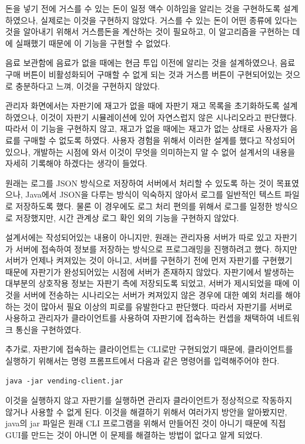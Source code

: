 \documentclass{oblivoir}
\begin{document}
    돈을 넣기 전에 거스를 수 있는 돈이 일정 액수 이하임을 알리는 것을 구현하도록 설계하였으나,
    실제로는 이것을 구현하지 않았다.
    거스를 수 있는 돈이 어떤 종류에 있다는 것을 알아내기 위해서 거스름돈을 계산하는 것이 필요하고,
    이 알고리즘을 구현하는 데에 실패했기 때문에 이 기능을 구현할 수 없었다.

    음료 보관함에 음료가 없을 때에는 현금 투입 이전에 알리는 것을 설계하였으나,
    음료 구매 버튼이 비활성화되어 구매할 수 없게 되는 것과
    거스름 버튼이 구현되어있는 것으로 충분하다고 느껴, 이것을 구현하지 않았다.

    관리자 화면에서는 자판기에 재고가 없을 때에 자판기 재고 목록을 초기화하도록 설계하였으나,
    이것이 자판기 시뮬레이션에 있어 자연스럽지 않은 시나리오라고 판단했다.
    따라서 이 기능을 구현하지 않고, 재고가 없을 때에는 재고가 없는 상태로
    사용자가 음료를 구매할 수 없도록 하였다.
    사용자 경험을 위해서 이러한 설계를 했다고 작성되어 있으나,
    개발하는 시점에 와서 이것이 무엇을 의미하는지 알 수 없어 설계서의 내용을 자세히 기록해야 하겠다는
    생각이 들었다.

    원래는 로그를 JSON 방식으로 저장하여 서버에서 처리할 수 있도록 하는 것이 목표였으나,
    Java에서 JSON을 다루는 방식이 익숙하지 않아서 로그를 일반적인 텍스트 파일로 저장하도록 했다.
    물론 이 경우에도 로그 처리 편의를 위해서 로그를 일정한 방식으로 저장했지만,
    시간 관계상 로그 확인 외의 기능을 구현하지 않았다.

    설계서에는 작성되어있는 내용이 아니지만, 원래는 관리자용 서버가 따로 있고
    자판기가 서버에 접속하여 정보를 저장하는 방식으로 프로그래밍을 진행하려고 했다.
    하지만 서버가 언제나 켜져있는 것이 아니고, 서버를 구현하기 전에 먼저 자판기를 구현했기 때문에
    자판기가 완성되어있는 시점에 서버가 존재하지 않았다.
    자판기에서 발생하는 대부분의 상호작용 정보는 자판기 측에 저장되도록 되었고,
    서버가 제시되었을 때에 이것을 서버에 전송하는 시나리오는
    서버가 켜져있지 않은 경우에 대한 예외 처리를 해야 하는 것이 많아서
    필요 이상의 피로를 유발한다고 판단했다.
    따라서 자판기를 서버로 사용하고 관리자가 클라이언트를 사용하여
    자판기에 접속하는 컨셉을 채택하여 네트워크 통신을 구현하였다.

    추가로, 자판기에 접속하는 클라이언트는 CLI로만 구현되었기 때문에,
    클라이언트를 실행하기 위해서는 명령 프롬프트에서 다음과 같은 명령어를 입력해주어야 한다.
    \begin{verbatim}
java -jar vending-client.jar\end{verbatim}
    이것을 실행하지 않고 자판기를 실행하면 관리자 클라이언트가 정상적으로 작동하지 않거나 사용할 수 없게 된다.
    이것을 해결하기 위해서 여러가지 방안을 알아봤지만, java의 jar 파일은 원래 CLI 프로그램을 위해서 만들어진 것이 아니기 때문에
    직접 GUI를 만드는 것이 아니면 이 문제를 해결하는 방법이 없다고 알게 되었다.
\end{document}

